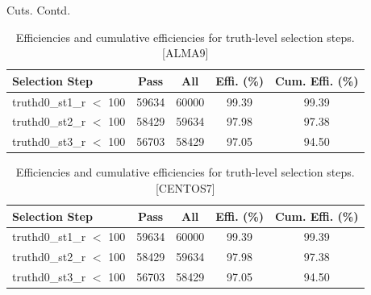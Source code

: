 \begin{frame}{Cuts. Contd.}
    \begin{table}[h!]
        \centering
        \small
        \begin{tabular}{|l|c|c|c|c|}
        \hline
        \textbf{Selection Step} & \textbf{Pass} & \textbf{All} & \textbf{Effi. (\%)} & \textbf{Cum. Effi. (\%)} \\ \hline
        truthd0\_st1\_r $<$ 100    & 59634        & 60000       & 99.39                   & 99.39                              \\ \hline
        truthd0\_st2\_r $<$ 100   & 58429        & 59634       & 97.98                   & 97.38                              \\ \hline
        truthd0\_st3\_r $<$ 100   & 56703        & 58429       & 97.05                   & 94.50                              \\ \hline
        \end{tabular}
        \caption{Efficiencies and cumulative efficiencies for truth-level selection steps. [ALMA9]}
        \label{table:truth_efficiency}
    \end{table}
    \begin{table}[h!]
        \centering
        \small
        \begin{tabular}{|l|c|c|c|c|}
        \hline
        \textbf{Selection Step} & \textbf{Pass} & \textbf{All} & \textbf{Effi. (\%)} & \textbf{Cum. Effi. (\%)} \\ \hline
        truthd0\_st1\_r $<$ 100    & 59634        & 60000       & 99.39                   & 99.39                              \\ \hline
        truthd0\_st2\_r $<$ 100   & 58429        & 59634       & 97.98                   & 97.38                              \\ \hline
        truthd0\_st3\_r $<$ 100   & 56703        & 58429       & 97.05                   & 94.50                              \\ \hline
        \end{tabular}
        \caption{Efficiencies and cumulative efficiencies for truth-level selection steps. [CENTOS7]}
        \label{table:truth_efficiency}
    \end{table}
        
\end{frame}

